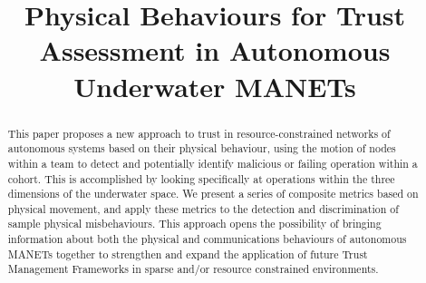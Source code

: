\documentclass[conference,compsoc,letterpaper]{IEEEtran}
\begin{document}
%
\title{Physical Behaviours for Trust Assessment in Autonomous Underwater MANETs}


\author{
\and
{}
}





\maketitle



\begin{abstract}


This paper proposes a new approach to trust in resource-constrained networks of autonomous systems based on their physical behaviour, using the motion of nodes within a team to detect and potentially identify malicious or failing operation within a cohort.
This is accomplished by looking specifically at operations within the three dimensions of the underwater space.
We present a series of composite metrics based on physical movement, and apply these metrics to the detection and discrimination of sample physical misbehaviours.
This approach opens the possibility of bringing information about both the physical and communications behaviours of autonomous MANETs together to strengthen and expand the application of future Trust Management Frameworks in sparse and/or resource constrained environments.

\end{abstract}
\end{document}
